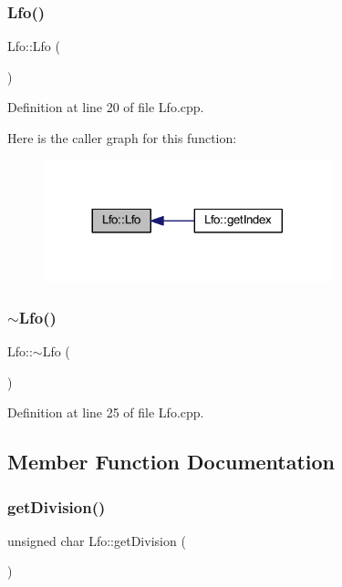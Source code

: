 \subsubsection{\texorpdfstring{Lfo()}{Lfo()}}
{\footnotesize\ttfamily Lfo\+::\+Lfo (\begin{DoxyParamCaption}{ }\end{DoxyParamCaption})}



Definition at line 20 of file Lfo.\+cpp.

Here is the caller graph for this function\+:
\nopagebreak
\begin{figure}[H]
\begin{center}
\leavevmode
\includegraphics[width=236pt]{class_lfo_aa1546b11ce8b14895de9200209006332_icgraph}
\end{center}
\end{figure}
\mbox{\label{class_lfo_a95e36a9f84091073c742983741247367}} 
\subsubsection{\texorpdfstring{$\sim$\+Lfo()}{~Lfo()}}
{\footnotesize\ttfamily Lfo\+::$\sim$\+Lfo (\begin{DoxyParamCaption}{ }\end{DoxyParamCaption})}



Definition at line 25 of file Lfo.\+cpp.



\subsection{Member Function Documentation}
\mbox{\label{class_lfo_afba7d39f952c4b02d101f8e46e9cc20d}} 
\subsubsection{\texorpdfstring{get\+Division()}{getDivision()}}
{\footnotesize\ttfamily unsigned char Lfo\+::get\+Division (\begin{DoxyParamCaption}{ }\end{DoxyParamCaption})\hspace{0.3cm}{\ttfamily [inline]}}



